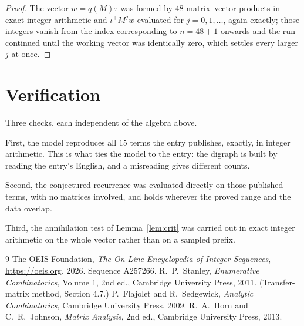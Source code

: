 \documentclass[11pt,a4paper]{article}
\theoremstyle{plain}
\theoremstyle{definition}
\begin{document}
\begin{proof}
The vector $w=q(M)\tau$ was formed by $48$ matrix--vector products in exact integer
arithmetic and $\iota^{\!\top}M^{j}w$ evaluated for $j=0,1,\dots$, again exactly; those
integers vanish from the index corresponding to $n=48+1$ onwards and the run continued
until the working vector was identically zero, which settles every larger $j$ at once.
\end{proof}

\section{Verification}

Three checks, each independent of the algebra above.

First, the model reproduces all $15$ terms the entry publishes, exactly, in integer
arithmetic. This is what ties the model to the entry: the digraph is built by reading the
entry's English, and a misreading gives different counts.

Second, the conjectured recurrence was evaluated directly on those published terms, with no
matrices involved, and holds wherever the proved range and the data overlap.

Third, the annihilation test of Lemma~\ref{lem:crit} was carried out in exact integer
arithmetic on the whole vector rather than on a sampled prefix.

\begin{thebibliography}{9}
 The OEIS Foundation, \emph{The On-Line Encyclopedia of Integer
Sequences}, \url{https://oeis.org}, 2026. Sequence A257266.
 R.~P.~Stanley, \emph{Enumerative Combinatorics}, Volume 1, 2nd ed.,
Cambridge University Press, 2011. (Transfer-matrix method, Section 4.7.)
 P.~Flajolet and R.~Sedgewick, \emph{Analytic Combinatorics}, Cambridge
University Press, 2009.
 R.~A.~Horn and C.~R.~Johnson, \emph{Matrix Analysis}, 2nd ed., Cambridge
University Press, 2013.
\end{thebibliography}
\end{document}
